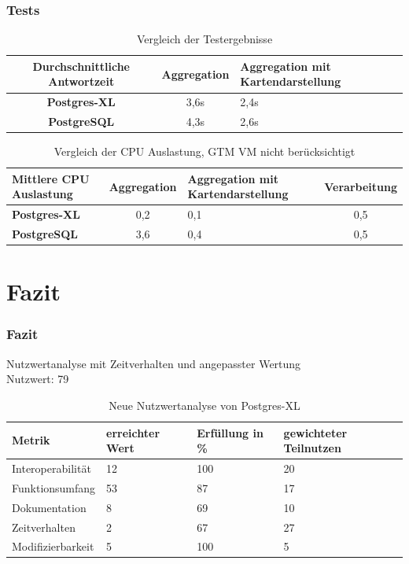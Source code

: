 \documentclass{beamer}
\begin{document}
\begin{frame}\frametitle{Tests}
\begin{table}
\centering
\small
\begin{tabular}{|c|c|C{3cm}|}
\hline
\textbf{Durchschnittliche Antwortzeit} & \textbf{Aggregation} & \textbf{Aggregation mit Kartendarstellung} \\ \hline
\textbf{Postgres-XL} & 3,6s & 2,4s \\ \hline
\textbf{PostgreSQL} & 4,3s & 2,6s \\ \hline
\end{tabular}
\caption{Vergleich der Testergebnisse}
\end{table}

\begin{table}
\centering
\small
\begin{tabular}{|C{2.4cm}|c|C{2.9cm}|c|}
\hline
\textbf{Mittlere CPU Auslastung} & \textbf{Aggregation} & \textbf{Aggregation mit Kartendarstellung} & \textbf{Verarbeitung} \\ \hline
\textbf{Postgres-XL} & 0,2 & 0,1 & 0,5 \\ \hline
\textbf{PostgreSQL} & 3,6 & 0,4 & 0,5 \\ \hline	
\end{tabular}
\caption{Vergleich der CPU Auslastung, GTM VM nicht berücksichtigt}
\end{table}
\end{frame}

\section{Fazit}
 
\begin{frame}\frametitle{Fazit}
\begin{center}
Nutzwertanalyse mit Zeitverhalten und angepasster Wertung\\ %
Nutzwert: 79
\end{center}
\begin{table}[h!]
\centering
\small
\begin{tabular}{|l|p{1.8cm}|l|p{1.8cm}|}
\hline
\textbf{Metrik} & \textbf{erreichter Wert} & \textbf{Erfüllung in \%} & \textbf{gewichteter Teilnutzen} \\ \hline
Interoperabilität & 12 & 100 & 20 \\ \hline
Funktionsumfang & 53 & 87 & 17 \\ \hline
Dokumentation & 8 & 69 & 10 \\ \hline
Zeitverhalten & 2 & 67 &  27 \\ \hline
Modifizierbarkeit & 5 & 100 & 5 \\ \hline
\end{tabular}
\caption{Neue Nutzwertanalyse von Postgres-XL}
\end{table}
\end{frame}
 
\end{document}
